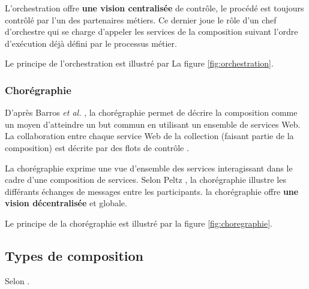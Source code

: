        L'orchestration offre \textbf{une vision centralisée} de
        contrôle, le procédé est toujours contrôlé par l'un des
        partenaires métiers. Ce dernier joue le rôle d'un chef
        d'orchestre qui se charge d'appeler les services de la
        composition suivant l'ordre d'exécution déjà défini par le
        processus métier.

        Le principe de l'orchestration est illustré
        par La figure \ref{fig:orchestration}.

        

        \subsubsection{Chorégraphie}
        \label{sec:choregraphie}

        D'après Barros \emph{et al.} \cite{barros2006standards}, la
        chorégraphie permet de décrire la composition comme un moyen
        d'atteindre un but commun en utilisant un ensemble de services
        Web. La collaboration entre chaque service Web de la
        collection (faisant partie de la composition) est décrite par
        des flots de contrôle \cite{lopez2008selection}.

        La chorégraphie exprime une vue d'ensemble des services
        interagissant dans le cadre d'une composition de
        services. Selon Peltz \cite{peltz2003web}, la chorégraphie
        illustre les différants échanges de messages entre les
        participants. la chorégraphie offre \textbf{une vision
          décentralisée} et globale.

        Le principe de la chorégraphie est illustré par la figure
        \ref{fig:choregraphie}.
        


      \subsection{Types de composition}
      \label{sec:types-de-composition}
      Selon \cite{fluegge2006challenges}.


